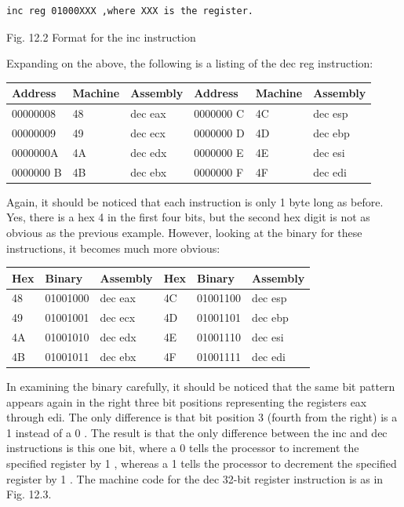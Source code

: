 \documentclass[10pt]{article}
\begin{document}
\begin{verbatim}
inc reg 01000XXX ,where XXX is the register.
\end{verbatim}

Fig. 12.2 Format for the inc instruction

Expanding on the above, the following is a listing of the dec reg instruction:

\begin{center}
\begin{tabular}{|l|l|l|l|l|l|}
\hline
Address & Machine & Assembly & Address & Machine & Assembly \\
\hline
00000008 & 48 & dec eax & 0000000 C & 4C & dec esp \\
\hline
00000009 & 49 & dec ecx & 0000000 D & 4D & dec ebp \\
\hline
0000000A & 4A & dec edx & 0000000 E & 4E & dec esi \\
\hline
0000000 B & 4B & dec ebx & 0000000 F & 4F & dec edi \\
\hline
\end{tabular}
\end{center}

Again, it should be noticed that each instruction is only 1 byte long as before. Yes, there is a hex 4 in the first four bits, but the second hex digit is not as obvious as the previous example. However, looking at the binary for these instructions, it becomes much more obvious:

\begin{center}
\begin{tabular}{|l|l|l|l|l|l|}
\hline
Hex & Binary & Assembly & Hex & Binary & Assembly \\
\hline
48 & 01001000 & dec eax & 4C & 01001100 & dec esp \\
\hline
49 & 01001001 & dec ecx & 4D & 01001101 & dec ebp \\
\hline
4A & 01001010 & dec edx & 4E & 01001110 & dec esi \\
\hline
4B & 01001011 & dec ebx & 4F & 01001111 & dec edi \\
\hline
\end{tabular}
\end{center}

In examining the binary carefully, it should be noticed that the same bit pattern appears again in the right three bit positions representing the registers eax through edi. The only difference is that bit position 3 (fourth from the right) is a 1 instead of a 0 . The result is that the only difference between the inc and dec instructions is this one bit, where a 0 tells the processor to increment the specified register by 1 , whereas a 1 tells the processor to decrement the specified register by 1 . The machine code for the dec 32-bit register instruction is as in Fig. 12.3.
\end{document}
